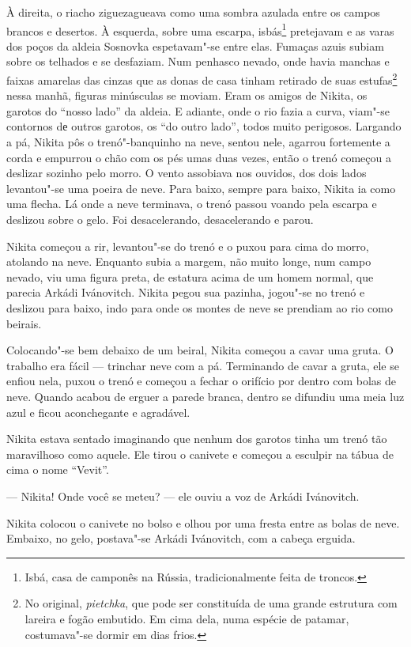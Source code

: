 À direita, o riacho ziguezagueava como uma sombra azulada entre os
campos brancos e desertos. À esquerda, sobre uma escarpa, isbás\footnote{Isbá, casa de camponês na Rússia, tradicionalmente feita de troncos.}
pretejavam e as varas dos poços da aldeia Sosnovka espetavam"-se entre
elas. Fumaças azuis subiam sobre os telhados e se desfaziam. Num
penhasco nevado, onde havia manchas e faixas amarelas das cinzas que as
donas de casa tinham retirado de suas estufas\footnote{No original,
  \emph{pietchka}, que pode ser constituída de uma grande estrutura com
  lareira e fogão embutido. Em cima dela, numa espécie de patamar,
  costumava"-se dormir em dias frios.} nessa manhã, figuras minúsculas se
moviam. Eram os amigos de Nikita, os garotos do ``nosso lado'' da
aldeia. E adiante, onde o rio fazia a curva, viam"-se contornos dе outros
garotos, os ``do outro lado'', todos muito perigosos. Largando a pá, Nikita
pôs o trenó"-banquinho na neve, sentou nele, agarrou fortemente a
corda e empurrou o chão com os pés umas duas vezes, então o trenó começou a
deslizar sozinho pelo morro. O vento assobiava nos ouvidos, dos dois
lados levantou"-se uma poeira de neve. Para baixo, sempre para baixo, Nikita
ia como uma flecha. Lá onde a neve terminava, o trenó passou voando pela
escarpa e deslizou sobre o gelo. Foi desacelerando, desacelerando e
parou.

Nikita começou a rir, levantou"-se do trenó e o puxou para cima do morro,
atolando na neve. Enquanto subia a margem, não muito longe, num campo
nevado, viu uma figura preta, de estatura acima de um homem normal, que
parecia Arkádi Ivánovitch. Nikita pegou sua pazinha, jogou"-se no trenó e
deslizou para baixo, indo para onde os montes de neve se prendiam ao rio
como beirais.

Colocando"-se bem debaixo de um beiral, Nikita começou a cavar
uma gruta. O trabalho era fácil --- trinchar neve com a pá. Terminando
de cavar a gruta, ele se enfiou nela, puxou o trenó e começou a
fechar o orifício por dentro com bolas de neve. Quando acabou de erguer
a parede branca, dentro se difundiu uma meia luz azul e ficou
aconchegante e agradável.

Nikita estava sentado imaginando que nenhum dos garotos tinha um trenó
tão maravilhoso como aquele. Ele tirou o canivete e começou a esculpir
na tábua de cima o nome ``Vevit''.

--- Nikita! Onde você se meteu? --- ele ouviu a voz de Arkádi
Ivánovitch.

Nikita colocou o canivete no bolso e olhou por uma fresta entre as bolas
de neve. Embaixo, no gelo, postava"-se Arkádi Ivánovitch, com a cabeça
erguida.

